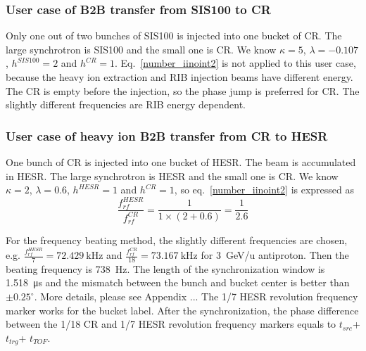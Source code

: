 \subsubsection{User case of B2B transfer from SIS100 to CR} 
Only one out of two bunches of SIS100 is injected into one bucket of CR. The large synchrotron is SIS100 and the small one is CR. We know $\kappa=5$, $\lambda=-0.107$, $h^{SIS100}=2$ and $h^{CR}=1$. Eq.~\ref{number_iinoint2} is not applied to this user case, because the heavy ion extraction and RIB injection beams have different energy. The CR is empty before the injection, so the phase jump is preferred for CR. The slightly different frequencies are RIB energy dependent.


\subsubsection{User case of heavy ion B2B transfer from CR to HESR} 

One bunch of CR is injected into one bucket of HESR. The beam is accumulated in HESR. The large synchrotron is HESR and the small one is CR. We know $\kappa=2$, $\lambda=0.6$, $h^{HESR}=1$ and $h^{CR}=1$, so eq.~\ref{number_iinoint2} is expressed as
\begin{equation}
\frac {f_{rf}^{HESR}}{f_{rf}^{CR}}= \frac {1}{1 \times(2+0.6)}=\frac{1}{2.6}
\end{equation}

For the frequency beating method, the slightly different frequencies are chosen, e.g. $\frac{f_{rf}^{HESR}}{7}=\SI{72.429}{\kHz}$ and $\frac{f_{rf}^{CR}}{18}=\SI{73.167}{\kHz}$ for \SI{3}{GeV/\atomicmassunit} antiproton. Then the beating frequency is \SI{738}{\Hz}. The length of the synchronization window is \SI{1.518}{\us} and the mismatch between the bunch and bucket center is better than $\pm0.25^\circ$. More details, please see Appendix ... The 1/7 HESR revolution frequency marker works for the bucket label. After the synchronization, the phase difference between the 1/18 CR and 1/7 HESR revolution frequency markers equals to $t_{src}$+$t_{trg}$+ $t_{TOF}$.

